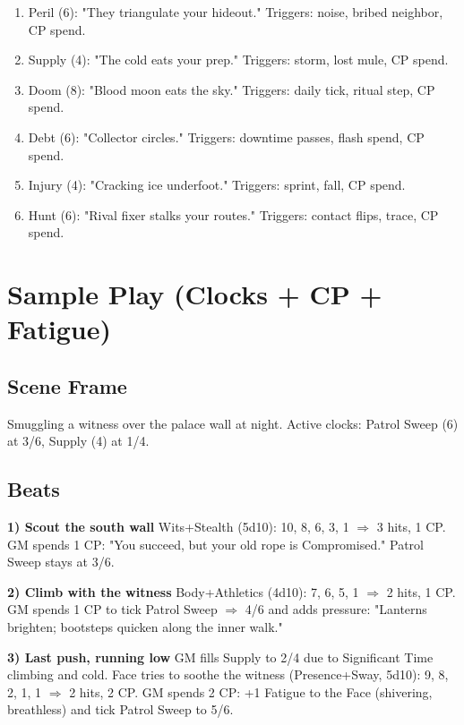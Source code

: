 \begin{enumerate}
\item Peril (6): "They triangulate your hideout." Triggers: noise, bribed neighbor, CP spend.
\item Supply (4): "The cold eats your prep." Triggers: storm, lost mule, CP spend.
\item Doom (8): "Blood moon eats the sky." Triggers: daily tick, ritual step, CP spend.
\item Debt (6): "Collector circles." Triggers: downtime passes, flash spend, CP spend.
\item Injury (4): "Cracking ice underfoot." Triggers: sprint, fall, CP spend.
\item Hunt (6): "Rival fixer stalks your routes." Triggers: contact flips, trace, CP spend.
\end{enumerate}

\section{Sample Play (Clocks + CP + Fatigue)}

\subsection{Scene Frame}
Smuggling a witness over the palace wall at night. Active clocks: Patrol Sweep (6) at 3/6, Supply (4) at 1/4.

\subsection{Beats}

\textbf{1) Scout the south wall} Wits+Stealth (5d10): 10, 8, 6, 3, 1 $\Rightarrow$ 3 hits, 1 CP. GM spends 1 CP: "You succeed, but your old rope is Compromised." Patrol Sweep stays at 3/6.

\textbf{2) Climb with the witness} Body+Athletics (4d10): 7, 6, 5, 1 $\Rightarrow$ 2 hits, 1 CP. GM spends 1 CP to tick Patrol Sweep $\Rightarrow$ 4/6 and adds pressure: "Lanterns brighten; bootsteps quicken along the inner walk."

\textbf{3) Last push, running low} GM fills Supply to 2/4 due to Significant Time climbing and cold. Face tries to soothe the witness (Presence+Sway, 5d10): 9, 8, 2, 1, 1 $\Rightarrow$ 2 hits, 2 CP. GM spends 2 CP: +1 Fatigue to the Face (shivering, breathless) and tick Patrol Sweep to 5/6.

